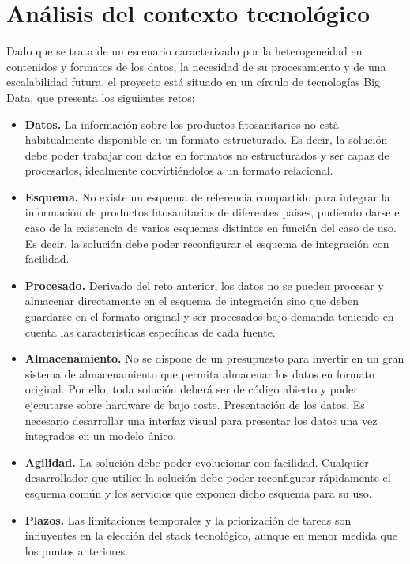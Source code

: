 \section{Análisis del contexto tecnológico}  \label{analisis.contexto}
Dado que se trata de un escenario caracterizado por la heterogeneidad en contenidos y formatos de los datos, la necesidad de su procesamiento y de una escalabilidad futura, el proyecto está situado en un círculo de tecnologías Big Data, que presenta los siguientes retos:
\begin{itemize}
\item \textbf{Datos.} La información sobre los productos fitosanitarios no está habitualmente disponible en un formato estructurado. Es decir, la solución debe poder trabajar con datos en formatos no estructurados y ser capaz de procesarlos, idealmente convirtiéndolos a un formato relacional.
\item \textbf{Esquema.} No existe un esquema de referencia compartido para integrar la información de productos fitosanitarios de diferentes países, pudiendo darse el caso de la existencia de varios esquemas distintos en función del caso de uso. Es decir, la solución debe poder reconfigurar el esquema de integración con facilidad.
\item \textbf{Procesado.} Derivado del reto anterior, los datos no se pueden procesar y almacenar directamente en el esquema de integración sino que  deben guardarse en el formato original y ser procesados bajo demanda teniendo en cuenta las características específicas de cada fuente.
\item \textbf{Almacenamiento.} No se dispone de un presupuesto para invertir en un gran sistema de almacenamiento que permita almacenar los datos en formato original. Por ello, toda solución deberá ser de código abierto y poder ejecutarse sobre hardware de bajo coste.
Presentación de los datos. Es necesario desarrollar una interfaz visual para presentar los datos una vez integrados en un modelo único. 
\item  \textbf{Agilidad.} La solución debe poder evolucionar con facilidad. Cualquier desarrollador que utilice la solución debe poder reconfigurar rápidamente el esquema común y los servicios que exponen dicho esquema para su uso.
\item \textbf{Plazos.} Las limitaciones temporales y la priorización de tareas son influyentes en la elección del stack tecnológico, aunque en menor medida que los puntos anteriores. 
\end{itemize}

